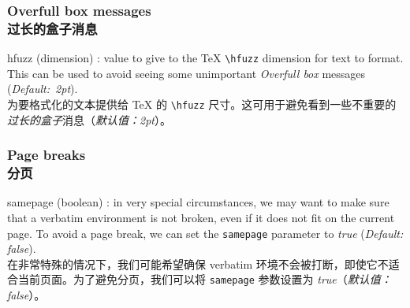 \documentclass[twoside]{article}
\newcommand\cs[1]{\texttt{\textbackslash#1}}
\providecommand\optname[1]{\textsf{#1}}
\newenvironment{optlist}{\begin{description}%
  \renewcommand\makelabel[1]{%
    \descriptionlabel{\mdseries\optname{##1}}}%
  \itemsep0.25\itemsep}%
 {\end{description}}
\newcommand\verbatimTxt{抄录}
\begin{document}
\subsubsection{Overfull box messages\\过长的盒子消息}

\begin{optlist}
  \item[hfuzz (dimension)]: value to give to the \TeX{} \cs{hfuzz} dimension
  for text to format. This can be used to avoid seeing some unimportant
  \emph{Overfull box} messages (\emph{Default:~2pt}).
\\为要格式化的文本提供给 \TeX{} 的 \cs{hfuzz} 尺寸。这可用于避免看到一些不重要的\emph{过长的盒子}消息（\emph{默认值：2pt}）。
\end{optlist}

\subsubsection{Page breaks\\分页}

\begin{optlist}
  \item[samepage (boolean)]: in very special circumstances, we may want to
  make sure that a verbatim environment is not broken, even if it does not
  fit on the current page. To avoid a page break, we can set the
  \texttt{samepage} parameter to \emph{true} (\emph{Default: false}).
\\在非常特殊的情况下，我们可能希望确保 verbatim 环境不会被打断，即使它不适合当前页面。为了避免分页，我们可以将 \texttt{samepage} 参数设置为 \emph{true}（\emph{默认值：false}）。
\end{optlist}
\end{document}
